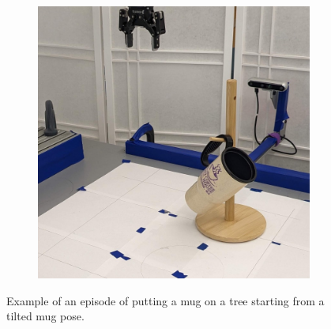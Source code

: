 \documentclass{article}
\begin{document}
\begin{figure}[]
\begin{subfigure}{(\linewidth - 0.05\linewidth)/5}
    \end{subfigure}
    \begin{subfigure}{(\linewidth - 0.05\linewidth)/5}
        \centering
        \includegraphics[width=\linewidth]{figures/episodes/mug_on_tree_zoom/10.jpg}
    \end{subfigure}

    \caption{Example of an episode of putting a mug on a tree starting from a tilted mug pose.}
    \label{fig:mug_tree_episode_small}
\end{figure}
\end{document}
